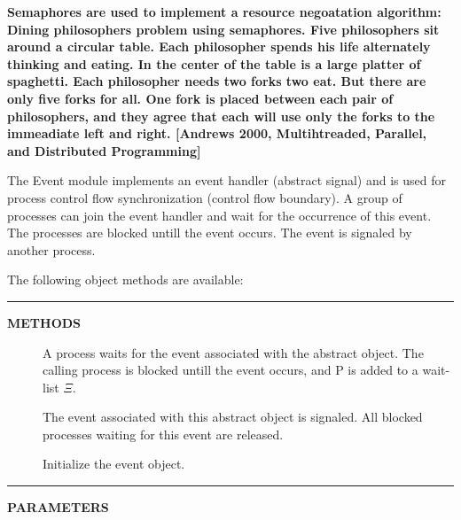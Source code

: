 \documentclass[a4paper,12pt,twoside,english]{article}
\begin{document}
\def\exdescription{\caption{\bf Semaphores are used to implement a resource negoatation algorithm: Dining philosophers problem using semaphores.  Five
philosophers sit around a circular table. Each philosopher spends his life alternately thinking and eating. In the center of the table is a large platter of
spaghetti. Each philosopher needs two forks two eat. But there are only five forks for all. One fork is placed between each pair  of philosophers, and they
agree that each will use only the forks to the  immeadiate left and right. {[}Andrews 2000, Multihtreaded, Parallel, and Distributed Programming{]}
}\label{example:9}}
\exampleBplain
\begin{example}[H]\let\normalsize\footnotesize \normalsize
\exdescription
\end{example}
\excontent



\def\thesubsubsection{\tocXLV}
\secIII{\label{toclabelXLV}\thesubsubsection}
The Event module implements an event handler (abstract signal) and is used for process control flow
synchronization (control flow boundary). A group of processes can join the event handler and wait for the occurrence of this event. The processes are blocked
untill the event occurs. The event is signaled by another process. 


\vskip5pt
The following object methods are available:


\vskip5pt
\vskip5pt\color{highlight-color}
{\rule[-1pt]{2em}{1em}\hskip15pt\bf METHODS

}
\color{black}

\begin{description}
\item[] $ $\\
A process waits for the event associated with the abstract object.  The calling process is blocked untill the event occurs, and P is added to a wait-list $\Xi$.

\item[] $ $\\
The event associated with this abstract object is signaled. All blocked processes waiting for this event are released. 

\item[] $ $\\
Initialize the event object.


\end{description}
\vskip5pt\color{highlight-color}
{\rule[-1pt]{2em}{1em}\hskip15pt\bf PARAMETERS

}
\color{black}
\end{document}
